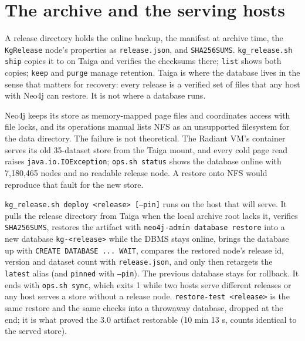 
\section{The archive and the serving hosts}
\label{sec:serving}

A release directory holds the online backup, the manifest at archive time, the
\texttt{KgRelease} node's properties as \texttt{release.json}, and
\texttt{SHA256SUMS}. \texttt{kg\_release.sh ship} copies it to
 on Taiga and
verifies the checksums there; \texttt{list} shows both copies; \texttt{keep} and
\texttt{purge} manage retention. Taiga is where the database lives in the sense
that matters for recovery: every release is a verified set of files that any
host with Neo4j can restore. It is not where a database runs.

Neo4j keeps its store as memory-mapped page files and coordinates access with
file locks, and its operations manual lists NFS as an unsupported filesystem for
the data directory. The failure is not theoretical. The
Radiant VM's container serves its old 35-dataset store from the Taiga mount, and
every cold page read raises \texttt{java.io.IOException}; \texttt{ops.sh status}
shows the database online with 7,180,465 nodes and no readable release node. A
restore onto NFS would reproduce that fault for the new store.

\texttt{kg\_release.sh deploy <release> [--pin]} runs on the host that will serve.
It pulls the release directory from Taiga when the local archive root lacks it,
verifies \texttt{SHA256SUMS}, restores the artifact with \texttt{neo4j-admin
database restore} into a new database \texttt{kg-<release>} while the DBMS stays
online, brings the database up with \texttt{CREATE DATABASE ... WAIT}, compares
the restored node's release id, version and dataset count with
\texttt{release.json}, and only then retargets the \texttt{latest} alias (and
\texttt{pinned} with \texttt{--pin}). The previous database stays for rollback.
It ends with \texttt{ops.sh sync}, which exits 1 while two hosts serve different
releases or any host serves a store without a release node.
\texttt{restore-test <release>} is the same restore and the same checks into a
throwaway database, dropped at the end; it is what proved the 3.0 artifact
restorable (10 min 13 s, counts identical to the served store).

